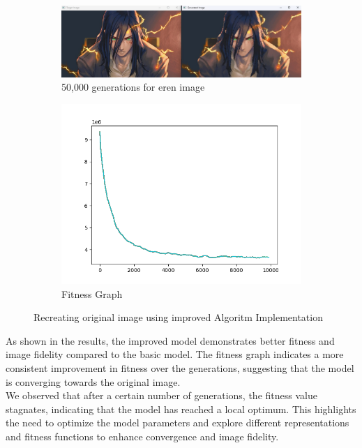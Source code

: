 \documentclass[10pt, conference]{IEEEtran}
\begin{document}
\begin{figure}[h!]
\begin{subfigure}{0.4\linewidth}
	\end{subfigure}
	\begin{subfigure}{0.8\linewidth}
		\centering
		\includegraphics[width=\linewidth]{Screenshot 2025-01-02 173147.png}
		\caption{50,000 generations for eren image}
	\end{subfigure}
	\begin{subfigure}{0.8\linewidth}
		\centering
		\includegraphics[width=\linewidth]{fitness_generation_9900.png}
		\caption{Fitness Graph}
	\end{subfigure}
	\caption{Recreating original image using improved Algoritm Implementation}
\end{figure}

As shown in the results, the improved model demonstrates better fitness and image fidelity compared to the basic model. The fitness graph indicates a more consistent improvement in fitness over the generations, suggesting that the model is converging towards the original image.\\ 
We observed that after a certain number of generations, the fitness value stagnates, indicating that the model has reached a local optimum. This highlights the need to optimize the model parameters and explore different representations and fitness functions to enhance convergence and image fidelity.
\end{document}
